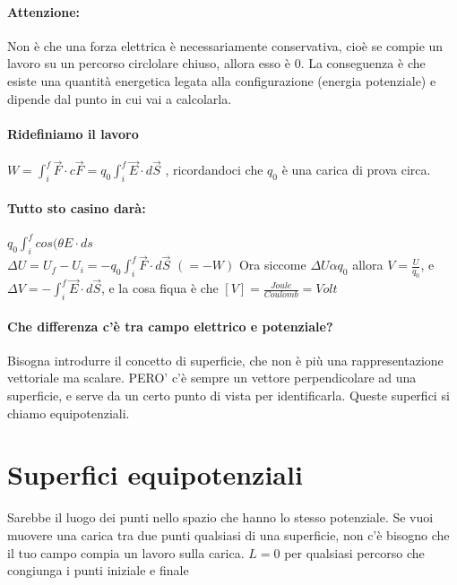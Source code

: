 \documentclass[12pt, a4paper, openany, oneside]{book}
\begin{document}
\paragraph{Attenzione: }Non è che una forza elettrica è necessariamente 
conservativa, cioè se compie un lavoro su un percorso circlolare chiuso, allora
esso è 0. La conseguenza è che esiste una quantità energetica legata alla 
configurazione (energia potenziale) e dipende dal punto in cui vai a calcolarla.
\paragraph{Ridefiniamo il lavoro} $W = \int_{i}^{f} \overrightarrow{F} \cdot c
 \overrightarrow{F} = q_{0} \int_{i}^{f} \overrightarrow{E} \cdot d \overrightarrow{S}$
 , ricordandoci che $q_{0}$ è una carica di prova circa.
 \paragraph{Tutto sto casino darà: }$q_{0} \int_{i}^{f} cos(\theta E \cdot ds$\\
 $\Delta U = U_{f} - U_{i} = - q_{0} \int_{i}^{f} \overrightarrow{F} \cdot d \overrightarrow{S}$
 $(= -W)$
 Ora siccome $\Delta U \alpha q_{0}$ allora $V = \frac{U}{q_0}$, e $\Delta V = -
  \int_{i}^{f} \overrightarrow{E} \cdot d \overrightarrow{S}$, e la cosa fiqua è
  che $[V] = \frac{Joule}{Coulomb} = Volt$
  \paragraph{Che differenza c'è tra campo elettrico e potenziale?} Bisogna
  introdurre il concetto di superficie, che non è più una rappresentazione 
  vettoriale ma scalare. PERO' c'è sempre un vettore perpendicolare ad una 
  superficie, e serve da un certo punto di vista per identificarla. 
  Queste superfici si chiamo equipotenziali. 
\section{Superfici equipotenziali}
Sarebbe il luogo dei punti nello spazio che hanno lo stesso potenziale. Se vuoi
muovere una carica tra due punti qualsiasi di una superficie, non c'è bisogno
che il tuo campo compia un lavoro sulla carica.
$L = 0$ per qualsiasi percorso che congiunga i punti iniziale e finale 
\end{document}
